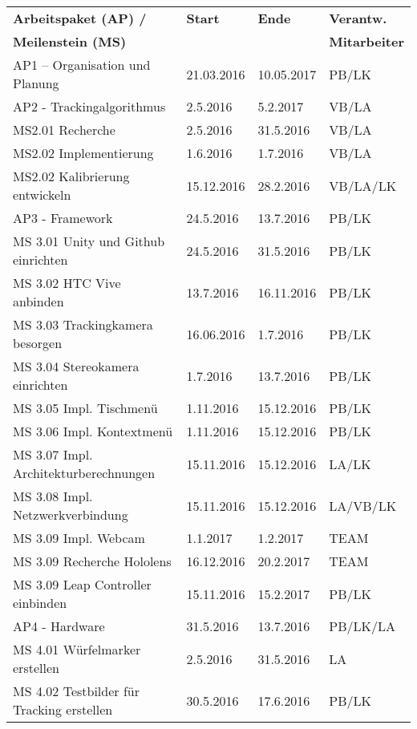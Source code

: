 \begin{table}
	\centering
	\begin{tabular}{|l|l|l|l|}
		\hline
		\Absatzbox{}
		\textbf{Arbeitspaket (AP) /}& \textbf{Start} &  \textbf{Ende} &  \textbf{Verantw.} \\
		\Absatzbox{}
		\textbf{Meilenstein (MS)}& & &\textbf{Mitarbeiter}\\
		\hline
		AP1 – Organisation und Planung & 21.03.2016 & 10.05.2017 & PB/LK\\		
  		\hline
		AP2 - Trackingalgorithmus & 2.5.2016 & 5.2.2017 & VB/LA\\
		\hline
		MS2.01 Recherche  & 2.5.2016 & 31.5.2016 & VB/LA\\
 	 	\hline
		MS2.02 Implementierung  & 1.6.2016 & 1.7.2016 & VB/LA\\
		\hline
		MS2.02 Kalibrierung entwickeln  & 15.12.2016 & 28.2.2016 & VB/LA/LK\\
		\hline
		AP3 - Framework  & 24.5.2016 & 13.7.2016 & PB/LK\\
		\hline
		MS 3.01 Unity und Github einrichten  & 24.5.2016 & 31.5.2016 & PB/LK\\
		\hline
		MS 3.02 HTC Vive anbinden & 13.7.2016 & 16.11.2016 & PB/LK\\
		\hline
		MS 3.03 Trackingkamera besorgen &16.06.2016 & 1.7.2016 & PB/LK\\
		\hline
		MS  3.04 Stereokamera einrichten &1.7.2016 & 13.7.2016 & PB/LK\\
		\hline
		MS  3.05 Impl. Tischmenü &1.11.2016 & 15.12.2016 & PB/LK\\
		\hline
		MS  3.06 Impl. Kontextmenü &1.11.2016 & 15.12.2016 & PB/LK\\
		\hline
		MS  3.07 Impl. Architekturberechnungen &15.11.2016 & 15.12.2016 & LA/LK\\
		\hline
		MS 3.08 Impl. Netzwerkverbindung &15.11.2016 & 15.12.2016 & LA/VB/LK\\
		\hline
		MS 3.09 Impl. Webcam &1.1.2017 & 1.2.2017 & TEAM\\
		\hline
		MS 3.09 Recherche Hololens  &16.12.2016 & 20.2.2017 & TEAM\\
		\hline
		MS 3.09 Leap Controller einbinden  &15.11.2016 & 15.2.2017 & PB/LK\\
		\hline
		AP4 - Hardware & 31.5.2016 & 13.7.2016 & PB/LK/LA\\
		\hline
		MS 4.01 Würfelmarker erstellen & 2.5.2016 & 31.5.2016 & LA\\
		\hline
		MS 4.02 Testbilder für Tracking erstellen  & 30.5.2016 & 17.6.2016 & PB/LK\\

\end{tabular}
\end{table}
